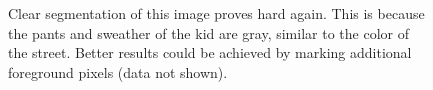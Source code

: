 \documentclass[11pt,a4paper]{article}
\begin{document}
\begin{figure}
\centering
{}
\quad
{}

\caption{Clear segmentation of this image proves hard again. This is because the pants and sweather of the kid are gray, similar to the color of the street. Better results could be achieved by marking additional foreground pixels (data not shown).}%

\end{figure}
\end{document}
